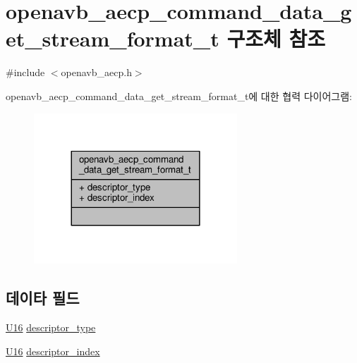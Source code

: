 \hypertarget{structopenavb__aecp__command__data__get__stream__format__t}{}\section{openavb\+\_\+aecp\+\_\+command\+\_\+data\+\_\+get\+\_\+stream\+\_\+format\+\_\+t 구조체 참조}
\label{structopenavb__aecp__command__data__get__stream__format__t}


{\ttfamily \#include $<$openavb\+\_\+aecp.\+h$>$}



openavb\+\_\+aecp\+\_\+command\+\_\+data\+\_\+get\+\_\+stream\+\_\+format\+\_\+t에 대한 협력 다이어그램\+:
\nopagebreak
\begin{figure}[H]
\begin{center}
\leavevmode
\includegraphics[width=216pt]{structopenavb__aecp__command__data__get__stream__format__t__coll__graph}
\end{center}
\end{figure}
\subsection*{데이타 필드}
\begin{DoxyCompactItemize}
\item 
\hyperlink{openavb__types__base__pub_8h_a0a0a322d5fa4a546d293a77ba8b4a71f}{U16} \hyperlink{structopenavb__aecp__command__data__get__stream__format__t_a1e231d7874aada5925b29affc76782cc}{descriptor\+\_\+type}
\item 
\hyperlink{openavb__types__base__pub_8h_a0a0a322d5fa4a546d293a77ba8b4a71f}{U16} \hyperlink{structopenavb__aecp__command__data__get__stream__format__t_ab26fb363c24b9a2a4391f9171c981b08}{descriptor\+\_\+index}
\end{DoxyCompactItemize}


